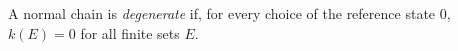 A normal chain is \emph{degenerate} if, for every choice of the reference state $0$, $k(E) = 0$ for all finite sets $E$.
